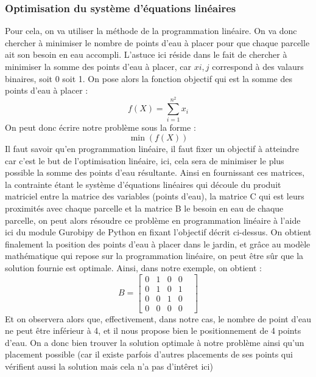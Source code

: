 \documentclass[french,a4paper]{article}
\begin{document}
\subsubsection{Optimisation du système d'équations linéaires}
Pour cela, on va utiliser la méthode de la programmation linéaire. On va donc chercher à minimiser le nombre de points d'eau à placer pour que chaque parcelle ait son besoin en eau accompli. L'astuce ici réside dans le fait de chercher à minimiser la somme des points d'eau à placer, car $xi,j$ correspond à des valaurs binaires, soit 0 soit 1.
\newline On pose alors la fonction objectif qui est la somme des points d'eau à placer :
\newline
\newline \begin{equation} f(X) = \sum_{i=1}^{n^2} x_i \end{equation}
\newline
\newline On peut donc écrire notre problème sous la forme :
\newline
\newline \begin{equation} \min (f(X)) \end{equation}
\newline
\newline Il faut savoir qu'en programmation linéaire, il faut fixer un objectif à atteindre car c'est le but de l'optimisation linéaire, ici, cela sera de minimiser le plus possible la somme des points d'eau résultante.
\newline Ainsi en fournissant ces matrices, la contrainte étant le système d'équations linéaires qui découle du produit matriciel entre la matrice des variables (points d'eau), la matrice C qui est leurs proximités avec chaque parcelle et la matrice B le besoin en eau de chaque parcelle, on peut alors résoudre ce problème en programmation linéaire à l'aide ici du module Gurobipy de Python en fixant l'objectif décrit ci-dessus.
\newline On obtient finalement la position des points d'eau à placer dans le jardin, et grâce au modèle mathématique qui repose sur la programmation linéaire, on peut être sûr que la solution fournie est optimale.
\newline Ainsi, dans notre exemple, on obtient :
\newline
\[ B = \begin{bmatrix} 0 & 1 & 0 & 0 \\ 0 & 1 & 0 & 1 & \\ 0 & 0 & 1 & 0 & \\ 0 & 0 & 0 & 0 \end{bmatrix} \]
\newline
Et on observera alors que, effectivement, dans notre cas, le nombre de point d'eau ne peut être inférieur à 4, et il nous propose bien le positionnement de 4 points d'eau.
On a donc bien trouver la solution optimale à notre problème ainsi qu'un placement possible (car il existe parfois d'autres placements de ses points qui vérifient aussi la solution mais cela n'a pas d'intêret ici)
\end{document}
